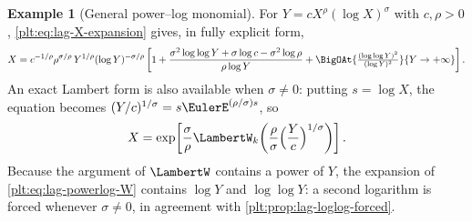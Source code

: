 \documentclass[11pt,oneside]{article}
\theoremstyle{plain}
\theoremstyle{definition}
\newtheorem{example}[theorem]{Example}
\theoremstyle{remark}
\begin{document}
\begin{example}[General power--log monomial]
\label{plt:ex:lag-powerlog}
For \(Y=cX^{\rho}(\log X)^{\sigma}\) with \(c,\rho>0\),
\cref{plt:eq:lag-X-expansion} gives, in fully explicit form,
\[
  X=c^{-1/\rho}\rho^{\sigma/\rho}\,Y^{1/\rho}(\log Y)^{-\sigma/\rho}
   \left[1+\frac{\sigma^2\log\log Y+\sigma\log c-\sigma^2\log\rho}
                {\rho\log Y}
    +\BigOAt{\tfrac{(\log\log Y)^2}{(\log Y)^2}}{Y\to+\infty}\right].
\]
An exact Lambert form is also available when \(\sigma\ne0\): putting
\(s=\log X\), the equation becomes \((Y/c)^{1/\sigma}=s\EulerE^{(\rho/\sigma)s}\),
so
\begin{equation}
\label{plt:eq:lag-powerlog-W}
  X=\exp\!\left[\frac{\sigma}{\rho}
    \LambertW_k\!\left(\frac{\rho}{\sigma}\Bigl(\frac Yc\Bigr)^{1/\sigma}\right)
   \right].
\end{equation}
Because the argument of \(\LambertW\) contains a power of \(Y\), the expansion
of \cref{plt:eq:lag-powerlog-W} contains \(\log Y\) and \(\log\log Y\): a
second logarithm is forced whenever \(\sigma\ne0\), in agreement with
\cref{plt:prop:lag-loglog-forced}.
\end{example}
\end{document}
